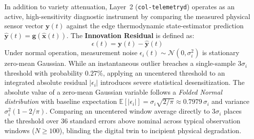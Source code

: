 In addition to variety attenuation, Layer~2 (\texttt{col-telemetryd}) operates as an active, high-sensitivity diagnostic instrument by comparing the measured physical sensor vector $\mathbf{y}(t)$ against the edge thermodynamic state-estimator prediction $\hat{\mathbf{y}}(t) = \mathbf{g}(\hat{\mathbf{x}}(t))$. The \textbf{Innovation Residual} is defined as:
\begin{equation}
\epsilon(t) = \mathbf{y}(t) - \hat{\mathbf{y}}(t)
\label{eq:l2_innovation_residual}
\end{equation}
Under normal operation, measurement noise $\epsilon_i(t) \sim \mathcal{N}(0, \sigma_i^2)$ is stationary zero-mean Gaussian. While an instantaneous outlier breaches a single-sample $3\sigma_i$ threshold with probability $0.27\%$, applying an uncentered threshold to an integrated absolute residual $|\epsilon_i|$ introduces severe statistical desensitization. The absolute value of a zero-mean Gaussian variable follows a \textit{Folded Normal distribution} with baseline expectation $\mathbb{E}[|\epsilon_i|] = \sigma_i \sqrt{2/\pi} \approx 0.7979\,\sigma_i$ and variance $\sigma_i^2(1 - 2/\pi)$. Comparing an uncentered window average directly to $3\sigma_i$ places the threshold over $36$ standard errors above nominal across typical observation windows ($N \ge 100$), blinding the digital twin to incipient physical degradation.

